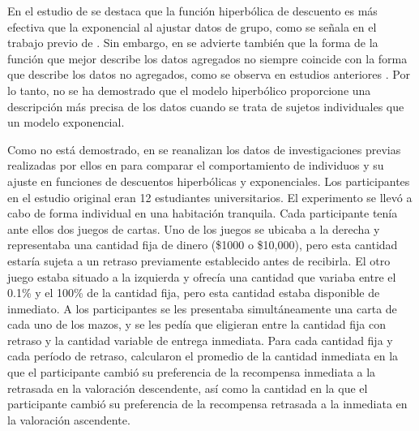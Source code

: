 En el estudio de \parencite{myerson1995discounting} se destaca que la función hiperbólica de descuento es más efectiva que la exponencial al ajustar datos de grupo, como se señala en el trabajo previo de \parencite{rachlin1991subjective}. Sin embargo, en \parencite{myerson1995discounting} se advierte también que la forma de la función que mejor describe los datos agregados no siempre coincide con la forma que describe los datos no agregados, como se observa en estudios anteriores \parencite{estes1956problem,sidman1952note}. Por lo tanto, no se ha demostrado que el modelo hiperbólico proporcione una descripción más precisa de los datos cuando se trata de sujetos individuales que un modelo exponencial. 

Como no está demostrado, en \parencite{myerson1995discounting} se reanalizan los datos de investigaciones previas realizadas por ellos en \parencite{green1994discounting} para comparar el comportamiento de individuos y su ajuste en funciones de descuentos hiperbólicas y exponenciales. Los participantes en el estudio original eran 12 estudiantes universitarios. El experimento se llevó a cabo de forma individual en una habitación tranquila. Cada participante tenía ante ellos dos juegos de cartas. Uno de los juegos se ubicaba a la derecha y representaba una cantidad fija de dinero (\$1000 o \$10,000), pero esta cantidad estaría sujeta a un retraso previamente establecido antes de recibirla. El otro juego estaba situado a la izquierda y ofrecía una cantidad que variaba entre el 0.1\% y el 100\% de la cantidad fija, pero esta cantidad estaba disponible de inmediato. A los participantes se les presentaba simultáneamente una carta de cada uno de los mazos, y se les pedía que eligieran entre la cantidad fija con retraso y la cantidad variable de entrega inmediata. Para cada cantidad fija y cada período de retraso, calcularon el promedio de la cantidad inmediata en la que el participante cambió su preferencia de la recompensa inmediata a la retrasada en la valoración descendente, así como la cantidad en la que el participante cambió su preferencia de la recompensa retrasada a la inmediata en la valoración ascendente. 

